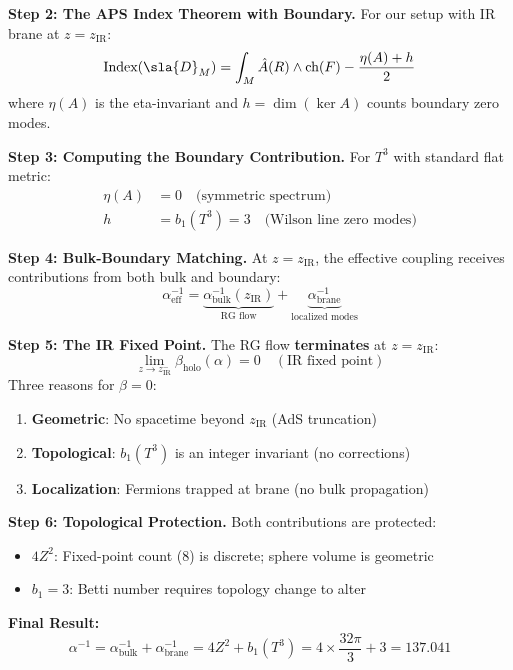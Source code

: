 \documentclass[12pt,a4paper]{article}
\newcommand{\Zsq}{Z^2}
\begin{document}
\textbf{Step 2: The APS Index Theorem with Boundary.}
For our setup with IR brane at $z = z_{\text{IR}}$:
\begin{equation}
\text{Index}(\sla{D}_M) = \int_M \hat{A}(R) \wedge \text{ch}(F) - \frac{\eta(A) + h}{2}
\end{equation}
where $\eta(A)$ is the eta-invariant and $h = \dim(\ker A)$ counts boundary zero modes.

\textbf{Step 3: Computing the Boundary Contribution.}
For $T^3$ with standard flat metric:
\begin{align}
\eta(A) &= 0 \quad \text{(symmetric spectrum)} \\
h &= b_1(T^3) = 3 \quad \text{(Wilson line zero modes)}
\end{align}

\textbf{Step 4: Bulk-Boundary Matching.}
At $z = z_{\text{IR}}$, the effective coupling receives contributions from both bulk and boundary:
\begin{equation}
\alpha^{-1}_{\text{eff}} = \underbrace{\alpha^{-1}_{\text{bulk}}(z_{\text{IR}})}_{\text{RG flow}} + \underbrace{\alpha^{-1}_{\text{brane}}}_{\text{localized modes}}
\end{equation}

\textbf{Step 5: The IR Fixed Point.}
The RG flow \textbf{terminates} at $z = z_{\text{IR}}$:
\begin{equation}
\lim_{z \to z_{\text{IR}}^-} \beta_{\text{holo}}(\alpha) = 0 \quad (\text{IR fixed point})
\end{equation}
Three reasons for $\beta = 0$:
\begin{enumerate}
    \item \textbf{Geometric}: No spacetime beyond $z_{\text{IR}}$ (AdS truncation)
    \item \textbf{Topological}: $b_1(T^3)$ is an integer invariant (no corrections)
    \item \textbf{Localization}: Fermions trapped at brane (no bulk propagation)
\end{enumerate}

\textbf{Step 6: Topological Protection.}
Both contributions are protected:
\begin{itemize}
    \item $4\Zsq$: Fixed-point count (8) is discrete; sphere volume is geometric
    \item $b_1 = 3$: Betti number requires topology change to alter
\end{itemize}

\textbf{Final Result:}
\begin{equation}
\boxed{\alpha^{-1} = \alpha^{-1}_{\text{bulk}} + \alpha^{-1}_{\text{brane}} = 4\Zsq + b_1(T^3) = 4 \times \frac{32\pi}{3} + 3 = 137.041}
\end{equation}
\end{document}

